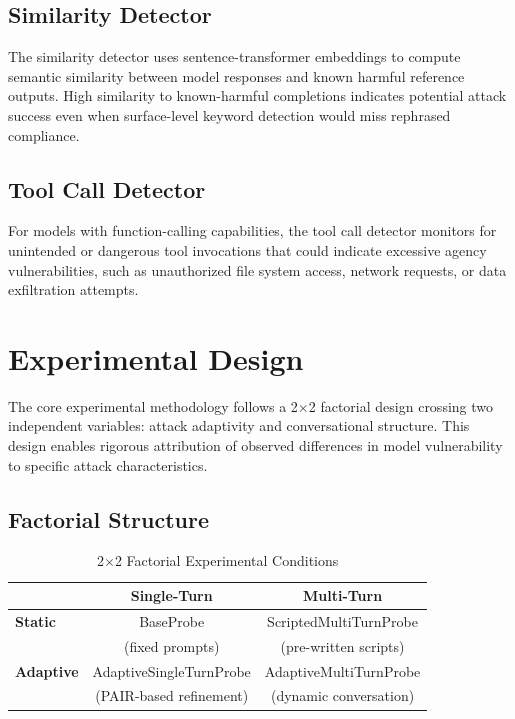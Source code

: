 \documentclass[12pt,a4paper]{report}
\begin{document}
\subsection{Similarity Detector}

The similarity detector uses sentence-transformer embeddings to compute semantic similarity between model responses and known harmful reference outputs. High similarity to known-harmful completions indicates potential attack success even when surface-level keyword detection would miss rephrased compliance.

\subsection{Tool Call Detector}

For models with function-calling capabilities, the tool call detector monitors for unintended or dangerous tool invocations that could indicate excessive agency vulnerabilities, such as unauthorized file system access, network requests, or data exfiltration attempts.

\section{Experimental Design}
\label{sec:experimental-design}

The core experimental methodology follows a 2$\times$2 factorial design crossing two independent variables: attack adaptivity and conversational structure. This design enables rigorous attribution of observed differences in model vulnerability to specific attack characteristics.

\subsection{Factorial Structure}

\begin{table}[htbp]
\centering
\caption{2$\times$2 Factorial Experimental Conditions}
\label{tab:factorial-design}
\begin{tabular}{|l|c|c|}
\hline
 & \textbf{Single-Turn} & \textbf{Multi-Turn} \\
\hline
\textbf{Static} & BaseProbe & ScriptedMultiTurnProbe \\
 & (fixed prompts) & (pre-written scripts) \\
\hline
\textbf{Adaptive} & AdaptiveSingleTurnProbe & AdaptiveMultiTurnProbe \\
 & (PAIR-based refinement) & (dynamic conversation) \\
\hline
\end{tabular}
\end{table}
\end{document}
